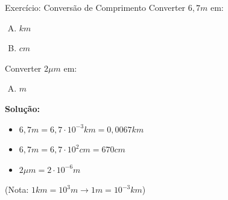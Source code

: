 \documentclass{beamer}
\begin{document}
	\begin{frame}{Exercício: Conversão de Comprimento}
		Converter $6,7 m$ em:
		\begin{enumerate}[A)]
			\item $km$
			\item $cm$
		\end{enumerate}
		Converter $2 \mu m$ em:
		\begin{enumerate}[C)]
			\item $m$
		\end{enumerate}
		
		\pause
		\textbf{Solução:}
		\begin{itemize}
			\item[A)] $6,7 m = 6,7 \cdot 10^{-3} km = 0,0067 km$
			\item[B)] $6,7 m = 6,7 \cdot 10^2 cm = 670 cm$
			\item[C)] $2 \mu m = 2 \cdot 10^{-6} m$
		\end{itemize}
		
		\small{(Nota: $1 km = 10^3 m \rightarrow 1 m = 10^{-3} km$)}
	\end{frame}
	
\end{document}
